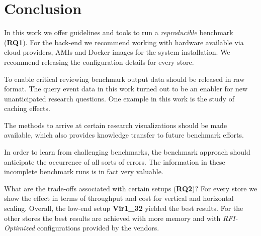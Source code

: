 \documentclass[twocolumn]{bmcart}%
\begin{document}
%
%
%
%
%
%







\section{Conclusion}
%


In this work we offer guidelines and tools to run a \emph{reproducible} benchmark (\textbf{RQ1}). For the back-end we recommend working with hardware available via cloud providers, AMIs and Docker images for the system installation. We recommend releasing the configuration details for every store. 

To enable critical reviewing benchmark output data should be released in raw format. The  query event data in this work turned out to be an enabler for new unanticipated research questions. One example in this work is the study of caching effects. 

The methods to arrive at certain research visualizations should be made available, which also provides knowledge transfer to future benchmark efforts. 

In order to learn from challenging benchmarks, the benchmark approach should anticipate the occurrence of all sorts of errors. The information in these incomplete benchmark runs is in fact very valuable. 

What are the trade-offs associated with certain \mbox{setups} (\textbf{RQ2})? For every store we show the effect in terms of throughput and cost for vertical and horizontal scaling. 
Overall, the low-end setup \textbf{Vir1\_32} yielded the best results. For the other stores the best results are achieved with more memory and with \emph{RFI-Optimized} configurations provided by the vendors.
\end{document}
